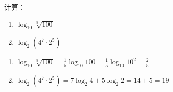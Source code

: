 \begin{example}
计算：
\begin{multicols}{2}
    \begin{enumerate}[(1)]
        \item $\log_{10}\sqrt[5]{100}$
        \item $\log_2 (4^7\cdot 2^5)$
    \end{enumerate}
\end{multicols}

\end{example}
 
\begin{solution}
    \begin{enumerate}[(1)]
        \item $\log_{10}\sqrt[5]{100}=\frac{1}{5}\log_{10}100=\frac{1}{5}\log_{10}10^2=\frac{2}{5}$
        \item $\log_2 (4^7\cdot 2^5)=7\log_2 4+5\log_2 2=14+5=19$
    \end{enumerate}
\end{solution}

